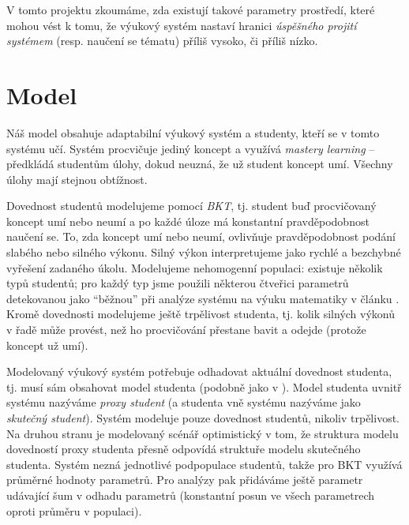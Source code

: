 \documentclass[twocolumn,10pt,cleanfoot]{asme2ej}
\begin{document}
V tomto projektu zkoumáme, zda existují takové parametry prostředí, které mohou vést k tomu, že výukový systém nastaví hranici \emph{úspěšného projití systémem} (resp. naučení se tématu) příliš vysoko, či příliš nízko.


\section{Model}

Náš model obsahuje adaptabilní výukový systém a studenty, kteří se v tomto systému učí. Systém procvičuje jediný koncept a využívá \emph{mastery learning} -- předkládá studentům úlohy, dokud neuzná, že už student koncept umí. Všechny úlohy mají stejnou obtížnost.

Dovednost studentů modelujeme pomocí \emph{BKT}, tj. student buď procvičovaný koncept umí nebo neumí a po každé úloze má konstantní pravděpodobnost naučení se. To, zda koncept umí nebo neumí, ovlivňuje pravděpodobnost podání slabého nebo silného výkonu. Silný výkon interpretujeme jako rychlé a bezchybné vyřešení zadaného úkolu. Modelujeme nehomogenní populaci: existuje několik typů studentů; pro každý typ jsme použili některou čtveřici parametrů detekovanou jako “běžnou” při analýze systému na výuku matematiky v článku \cite{bkt-reduce}. Kromě dovednosti modelujeme ještě trpělivost studenta, tj. kolik silných výkonů v řadě může provést, než ho procvičování přestane bavit a odejde (protože koncept už umí).

Modelovaný výukový systém potřebuje odhadovat aktuální dovednost studenta, tj. musí sám obsahovat model studenta (podobně jako v \cite{bkt-optimal-worst}). Model studenta uvnitř systému nazýváme \emph{proxy student} (a studenta vně systému nazýváme jako \emph{skutečný student}). Systém modeluje pouze dovednost studentů, nikoliv trpělivost. Na druhou stranu je modelovaný scénář optimistický v tom, že struktura modelu dovedností proxy studenta přesně odpovídá struktuře modelu skutečného studenta. Systém nezná jednotlivé podpopulace studentů, takže pro BKT využívá průměrné hodnoty parametrů. Pro analýzy pak přidáváme ještě parametr udávající šum v odhadu parametrů (konstantní posun ve všech parametrech oproti průměru v populaci).
\end{document}
